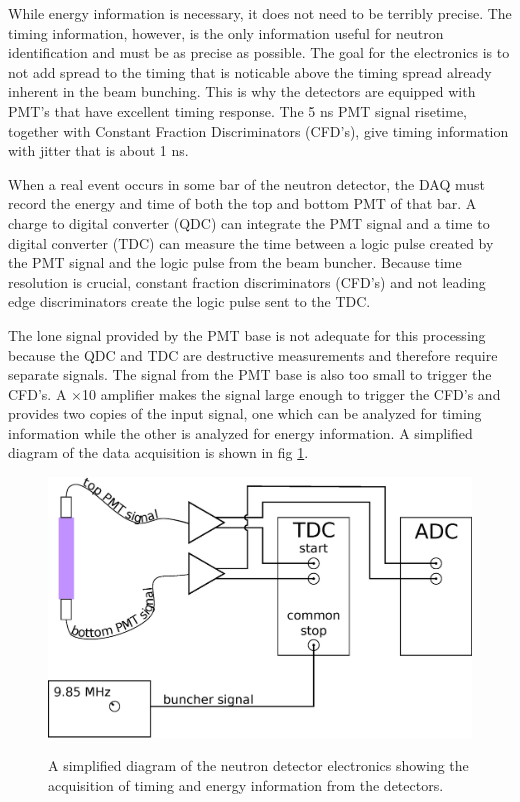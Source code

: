 While energy information is necessary, it does not need to be terribly precise.  The timing information, however, is the only information useful for neutron identification and must be as precise as possible.  The goal for the electronics is to not add spread to the timing that is noticable above the timing spread already inherent in the beam bunching.  This is why the detectors are equipped with PMT's that have excellent timing response.  The 5 ns PMT signal risetime, together with Constant Fraction Discriminators (CFD's), give timing information with jitter that is about 1 ns.


When a real event occurs in some bar of the neutron detector, the DAQ must record the energy and time of both the top and bottom PMT of that bar.  A charge to digital converter (QDC) can integrate the PMT signal and a time to digital converter (TDC) can measure the time between a logic pulse created by the PMT signal and the logic pulse from the beam buncher.  Because time resolution is crucial, constant fraction discriminators (CFD's) and not leading edge discriminators create the logic pulse sent to the TDC.  

The lone signal provided by the PMT base is not adequate for this processing because the QDC and TDC are destructive measurements and therefore require separate signals.  The signal from the PMT base is also too small to trigger the CFD's.  A $\times$10 amplifier makes the signal large enough to trigger the CFD's and provides two copies of the input signal, one which can be analyzed for timing information while the other is analyzed for energy information.  A simplified diagram of the data acquisition is shown in fig \ref{fig:simpleElectronics}.

\begin{figure}[htp]
\centering
\includegraphics[width=1.0\textwidth]{figures/basic_electronics.eps}
\label{fig:simpleElectronics}
\caption{A simplified diagram of the neutron detector electronics showing the acquisition of timing and energy information from the detectors.}
\end{figure}

